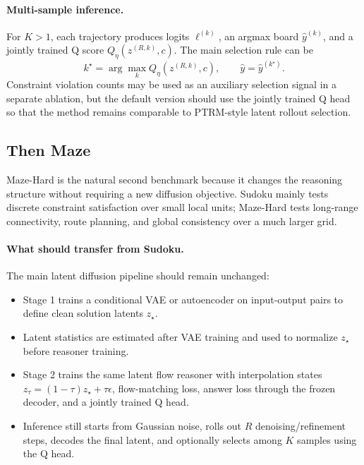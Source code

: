 \documentclass[11pt]{article}
\begin{document}
\paragraph{Multi-sample inference.}
For \(K>1\), each trajectory produces logits \(\ell^{(k)}\), an argmax board \(\hat y^{(k)}\), and a jointly trained Q score \(Q_\eta(z^{(R,k)},c)\). The main selection rule can be
\[
    k^\star=\arg\max_k Q_\eta(z^{(R,k)},c),
    \qquad
    \hat y=\hat y^{(k^\star)}.
\]
Constraint violation counts may be used as an auxiliary selection signal in a separate ablation, but the default version should use the jointly trained Q head so that the method remains comparable to PTRM-style latent rollout selection.

\subsection{Then Maze}

Maze-Hard is the natural second benchmark because it changes the reasoning structure without requiring a new diffusion objective. Sudoku mainly tests discrete constraint satisfaction over small local units; Maze-Hard tests long-range connectivity, route planning, and global consistency over a much larger grid.

\paragraph{What should transfer from Sudoku.}
The main latent diffusion pipeline should remain unchanged:
\begin{itemize}[itemsep=0pt]
    \item Stage 1 trains a conditional VAE or autoencoder on input-output pairs to define clean solution latents \(z_\star\).
    \item Latent statistics are estimated after VAE training and used to normalize \(z_\star\) before reasoner training.
    \item Stage 2 trains the same latent flow reasoner with interpolation states \(z_\tau=(1-\tau)z_\star+\tau\epsilon\), flow-matching loss, answer loss through the frozen decoder, and a jointly trained Q head.
    \item Inference still starts from Gaussian noise, rolls out \(R\) denoising/refinement steps, decodes the final latent, and optionally selects among \(K\) samples using the Q head.
\end{itemize}
\end{document}
